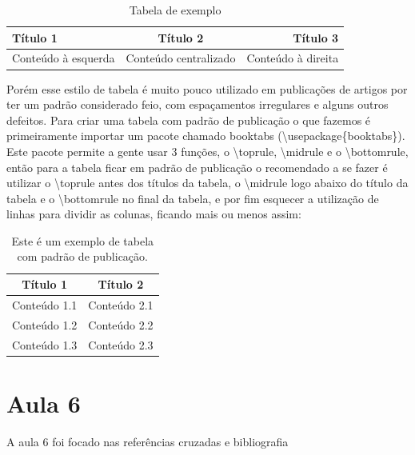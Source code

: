 \begin{table}[htbp]
    \centering
    \begin{tabular}{|l|c|r|}
        \hline 
         Título 1 & Título 2 & Título 3 \\
         \hline
         Conteúdo à esquerda & Conteúdo centralizado & Conteúdo à direita\\
         \hline
    \end{tabular}
    \caption{Tabela de exemplo}
    \label{tab:tabelaExemplo}
\end{table}

Porém esse estilo de tabela é muito pouco utilizado em publicações de artigos por ter um padrão considerado feio, com espaçamentos irregulares e alguns outros defeitos. Para criar uma tabela com padrão de publicação o que fazemos é primeiramente importar um pacote chamado booktabs (\textbackslash usepackage\{booktabs\}). Este pacote permite a gente usar 3 funções, o \textbackslash toprule, \textbackslash midrule e o \textbackslash bottomrule, então para a tabela ficar em padrão de publicação o recomendado a se fazer é utilizar o \textbackslash toprule antes dos títulos da tabela, o \textbackslash midrule logo abaixo do título da tabela e o \textbackslash bottomrule no final da tabela, e por fim esquecer a utilização de linhas para dividir as colunas, ficando mais ou menos assim:

\begin{table}[htbp]
    \centering
    \caption{Este é um exemplo de tabela com padrão de publicação.}
    \begin{tabular}{c c}
        \toprule
        Título 1 & Título 2 \\
        \midrule
         Conteúdo 1.1 & Conteúdo 2.1\\
         Conteúdo 1.2 & Conteúdo 2.2\\
         Conteúdo 1.3 & Conteúdo 2.3\\
         \bottomrule
    \end{tabular}
    \label{tab:placeholder}
\end{table}

\section{Aula 6}
A aula 6 foi focado nas referências cruzadas e bibliografia

